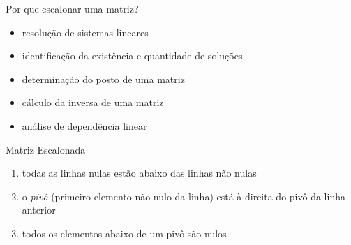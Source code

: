 \documentclass[fleqn,aspectratio=169,12pt]{beamer}
\begin{document}
\begin{frame}{Por que escalonar uma matriz?}
   \\

  \medskip

  \medskip
  \vspace{-0.5\baselineskip}
  \begin{itemize}[<+->]
    \item resolução de sistemas lineares
    \item identificação da existência e quantidade de soluções
    \item determinação do posto de uma matriz
    \item cálculo da inversa de uma matriz
    \item análise de dependência linear
  \end{itemize}
\end{frame}

\begin{frame}{Matriz Escalonada}
  \begin{enumerate}[<+->]
      \item todas as linhas nulas estão abaixo das linhas não nulas

      \item o \emph{pivô} (primeiro elemento não nulo da linha)
      está à direita do pivô da linha anterior

      \item todos os elementos abaixo de um pivô são nulos
  \end{enumerate}

  \medskip
\end{frame}
\end{document}
